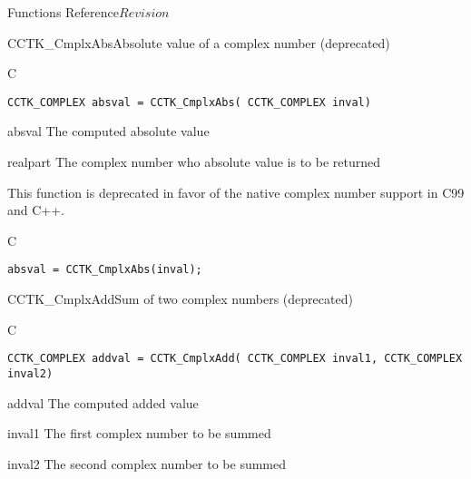 \begin{cactuspart}{ Functions Reference}{}{$Revision$}
\begin{FunctionDescription}{CCTK\_CmplxAbs}{Absolute value of a complex number (deprecated)}
\label{CCTK-CmplxAbs}
\begin{SynopsisSection}
\begin{Synopsis}{C}
\begin{verbatim}CCTK_COMPLEX absval = CCTK_CmplxAbs( CCTK_COMPLEX inval)\end{verbatim}
\end{Synopsis}
\end{SynopsisSection}
\begin{ParameterSection}
\begin{Parameter}{absval}
The computed absolute value
\end{Parameter}
\begin{Parameter}{realpart}
The complex number who absolute value is to be returned
\end{Parameter}
\end{ParameterSection}

\begin{Discussion}
This function is deprecated in favor of the native complex number support in
C99 and C++.
\end{Discussion}
\begin{ExampleSection}
\begin{Example}{C}
\begin{verbatim}
absval = CCTK_CmplxAbs(inval);
\end{verbatim}
\end{Example}
\end{ExampleSection}
\end{FunctionDescription}


\begin{FunctionDescription}{CCTK\_CmplxAdd}{Sum of two complex numbers (deprecated)}
\label{CCTK-CmplxAdd}
\begin{SynopsisSection}
\begin{Synopsis}{C}
\begin{verbatim}CCTK_COMPLEX addval = CCTK_CmplxAdd( CCTK_COMPLEX inval1, CCTK_COMPLEX inval2)\end{verbatim}
\end{Synopsis}
\end{SynopsisSection}
\begin{ParameterSection}
\begin{Parameter}{addval}
The computed added value
\end{Parameter}
\begin{Parameter}{inval1}
The first complex number to be summed
\end{Parameter}
\begin{Parameter}{inval2}
The second complex number to be summed
\end{Parameter}
\end{ParameterSection}


\end{FunctionDescription}
\end{cactuspart}
